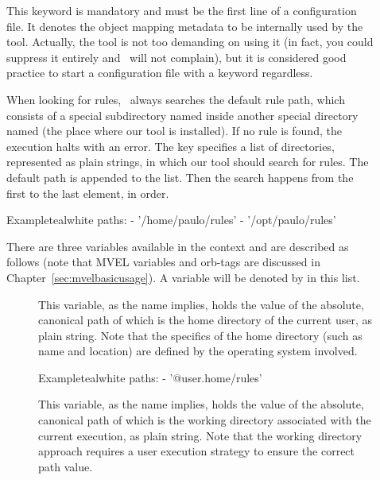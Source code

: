 \begin{description}
\item[] This keyword is mandatory and must be the first line of a configuration file. It denotes the object mapping metadata to be internally used by the tool. Actually, the tool is not too demanding on using it (in fact, you could suppress it entirely and \arara\ will not complain), but it is considered good practice to start a configuration file with a  keyword regardless.

\item[] When looking for rules, \arara\ always searches the default rule path, which consists of a special subdirectory named  inside another special directory named  (the place where our tool is installed). If no rule is found, the execution halts with an error. The  key specifies a list of directories, represented as plain strings, in which our tool should search for rules. The default path is appended to the list. Then the search happens from the first to the last element, in order.

\begin{codebox}{Example}{teal}{\icnote}{white}
paths:
- '/home/paulo/rules'
- '/opt/paulo/rules'
\end{codebox}

There are three variables available in the  context and are described as follows (note that \gls{MVEL} variables and \glspl{orb-tag} are discussed in Chapter~\ref{sec:mvelbasicusage}). A variable will be denoted by  in this list.

\begin{description}
\item[] This variable, as the name implies, holds the value of the absolute, canonical path of  which is the home directory of the current user, as plain string. Note that the specifics of the home directory (such as name and location) are defined by the operating system involved.

\begin{codebox}{Example}{teal}{\icnote}{white}
paths:
- '@{user.home}/rules'
\end{codebox}

\item[] This variable, as the name implies, holds the value of the absolute, canonical path of  which is the working directory associated with the current execution, as plain string. Note that the working directory approach requires a user execution strategy to ensure the correct path value.


\end{description}
\end{description}
